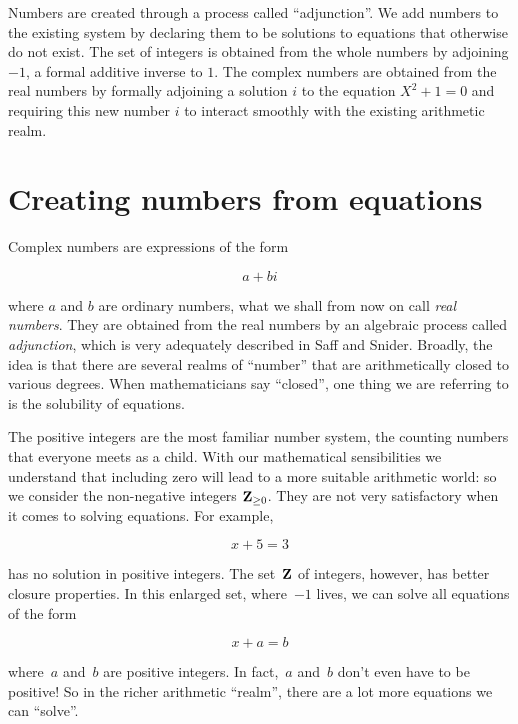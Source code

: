 \documentclass[twocolumn,12pt]{article}
\date{February 11, 2013 (Mon)}
\begin{document}
\makeheader

\begin{summary}
  Numbers are created through a process called ``adjunction''. We add numbers to the existing system by declaring them to be solutions to equations that otherwise do not exist. The set of integers is obtained from the whole numbers by adjoining $-1$, a formal additive inverse to $1$. The complex numbers are obtained from the real numbers by formally adjoining a solution $i$ to the equation $X^2 + 1 = 0$ and requiring this new number $i$ to interact smoothly with the existing arithmetic realm.
\end{summary}

\section{Creating numbers from equations}

Complex numbers are expressions of the form
\begin{gridenv}
\[
  a + bi
\]
\end{gridenv}
where $a$ and $b$ are ordinary numbers, what we shall from now on call \emph{real numbers}. They are obtained from the real numbers by an algebraic process called \emph{adjunction}, which is very adequately described in Saff and Snider. Broadly, the idea is that there are several realms of ``number'' that are arithmetically closed to various degrees. When mathematicians say ``closed'', one thing we are referring to is the solubility of equations.

The positive integers are the most familiar number system, the counting numbers that everyone meets as a child. With our mathematical sensibilities we understand that including zero will lead to a more suitable arithmetic world: so we consider the non-negative integers $\mathbf{Z}_{\geq 0}$. They are not very satisfactory when it comes to solving equations. For example,
\begin{gridenv}
\[
  x + 5 = 3
\]
\end{gridenv}
has no solution in positive integers. The set~$\mathbf{Z}$ of integers, however, has better closure properties. In this enlarged set, where~$-1$ lives, we can solve all equations of the form
\begin{gridenv}
\[
  x + a = b
\]
\end{gridenv}
where~$a$ and~$b$ are positive integers. In fact,~$a$ and~$b$ don't even have to be positive! So in the richer arithmetic ``realm'', there are a lot more equations we can ``solve''. 
\end{document}
